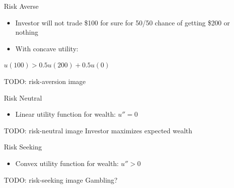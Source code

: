\documentclass[
14pt,notheorems,hyperref={pdfauthor=whatever}
]{beamer}
\begin{document}
\begin{frame}
Risk Averse\\
\hfill \break
\begin{itemize}
    \item Investor will not trade \$100 for sure for 50/50 chance of getting \$200 or nothing
    \item With concave utility:
\end{itemize}
\begin{center}
    $u(100) > 0.5 u(200) + 0.5 u(0)$\\
\end{center}
TODO: risk-aversion image
\end{frame}

\begin{frame}
Risk Neutral\\
\hfill \break
\begin{itemize}
    \item Linear utility function for wealth: $u''=0$
\end{itemize}
TODO: risk-neutral image
\hfill \break
Investor maximizes expected wealth\\
\end{frame}

\begin{frame}
Risk Seeking\\
\hfill \break
\begin{itemize}
    \item Convex utility function for wealth: $u''>0$
\end{itemize}
TODO: risk-seeking image
\hfill \break
Gambling?\\
\end{frame}
\end{document}
